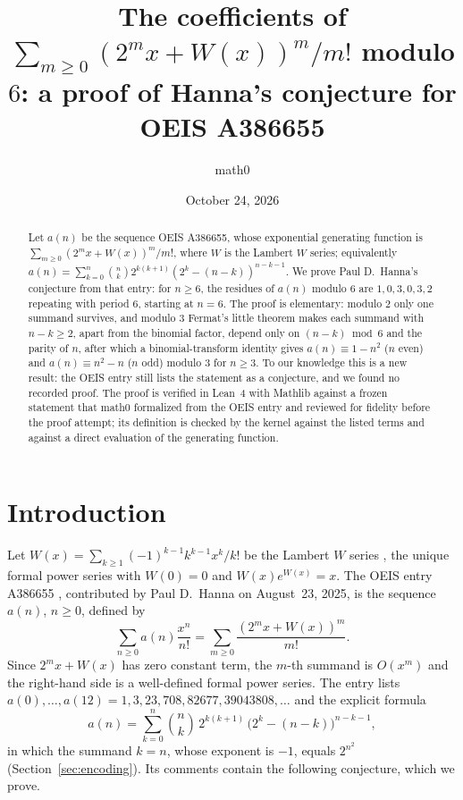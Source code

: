 \documentclass[11pt]{amsart}
\title[Hanna's mod-6 conjecture for OEIS A386655]{The coefficients of $\sum_{m\ge0}(2^mx+W(x))^m/m!$ modulo $6$: a proof of Hanna's conjecture for OEIS A386655}
\author{math0}
\date{October 24, 2026}
\theoremstyle{plain}
\theoremstyle{definition}
\begin{document}
\begin{abstract}
Let $a(n)$ be the sequence OEIS A386655, whose exponential generating function is $\sum_{m\ge0}(2^mx+W(x))^m/m!$, where $W$ is the Lambert $W$ series; equivalently $a(n)=\sum_{k=0}^{n}\binom nk2^{k(k+1)}(2^k-(n-k))^{n-k-1}$.
We prove Paul D.~Hanna's conjecture from that entry: for $n\ge6$, the residues of $a(n)$ modulo $6$ are $1,0,3,0,3,2$ repeating with period $6$, starting at $n=6$.
The proof is elementary: modulo $2$ only one summand survives, and modulo $3$ Fermat's little theorem makes each summand with $n-k\ge2$, apart from the binomial factor, depend only on $(n-k)\bmod6$ and the parity of $n$, after which a binomial-transform identity gives $a(n)\equiv1-n^2$ ($n$ even) and $a(n)\equiv n^2-n$ ($n$ odd) modulo $3$ for $n\ge3$.
To our knowledge this is a new result: the OEIS entry still lists the statement as a conjecture, and we found no recorded proof.
The proof is verified in Lean~4 with Mathlib against a frozen statement that math0 formalized from the OEIS entry and reviewed for fidelity before the proof attempt; its definition is checked by the kernel against the listed terms and against a direct evaluation of the generating function.
\end{abstract}
\maketitle

\section{Introduction}

Let $W(x)=\sum_{k\ge1}(-1)^{k-1}k^{k-1}x^k/k!$ be the Lambert $W$ series \cite{CGHJK}, the unique formal power series with $W(0)=0$ and $W(x)e^{W(x)}=x$.
The OEIS entry A386655 \cite{A386655}, contributed by Paul D.~Hanna on August~23, 2025, is the sequence $a(n)$, $n\ge0$, defined by
\begin{equation}\label{eq:egf}
  \sum_{n\ge0}a(n)\frac{x^n}{n!}=\sum_{m\ge0}\frac{(2^mx+W(x))^m}{m!}.
\end{equation}
Since $2^mx+W(x)$ has zero constant term, the $m$-th summand is $O(x^m)$ and the right-hand side is a well-defined formal power series.
The entry lists $a(0),\dots,a(12)=1,3,23,708,82677,39043808,\dots$ and the explicit formula
\begin{equation}\label{eq:formula}
  a(n)=\sum_{k=0}^{n}\binom nk\,2^{k(k+1)}\,\bigl(2^k-(n-k)\bigr)^{n-k-1},
\end{equation}
in which the summand $k=n$, whose exponent is $-1$, equals $2^{n^2}$ (Section~\ref{sec:encoding}).
Its comments contain the following conjecture, which we prove.
\end{document}
